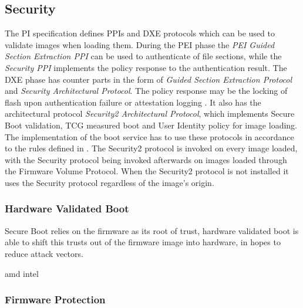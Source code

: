 
\subsection{Security}
\label{sec:uefi-pi:pi:security}

The \ac{PI} specification defines \acp{PPI} and \ac{DXE} protocols which can be used to validate images when loading them.
During the \ac{PEI} phase the \emph{\ac{PEI} Guided Section Extraction \ac{PPI}} can be used to authenticate of file sections, while the \emph{Security \ac{PPI}} implements the policy response to the authentication result.
The \ac{DXE} phase has counter parts in the form of \emph{Guided Section Extraction Protocol} and \emph{Security Architectural Protocol}.
The policy response may be the locking of flash upon authentication failure or attestation logging \cite[Vol. 2, Section 12.9.1]{pi-spec}.
It also has the architectural protocol \emph{Security2 Architectural Protocol}, which implements Secure Boot validation, \ac{TCG} measured boot and User Identity policy for image loading.
The implementation of the boot service  has to use these protocols in accordance to the rules defined in \cite[Vol. 2, Section 12.9.2]{pi-spec}.
The Security2 protocol is invoked on every image loaded, with the Security protocol being invoked afterwards on images loaded through the Firmware Volume Protocol.
When the Security2 protocol is not installed it uses the Security protocol regardless of the image's origin.


\subsubsection{Hardware Validated Boot}


Secure Boot relies on the firmware as its root of trust, hardware validated boot is able to shift this trusts out of the firmware image into hardware, in hopes to reduce attack vectors.


amd
intel

\subsubsection{Firmware Protection}

